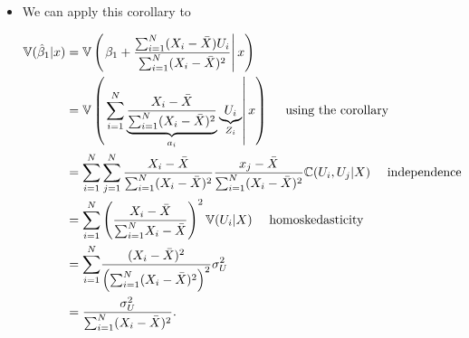 \begin{frame}[shrink]

\begin{itemize}

\item We can apply this corollary to 

\begin{align*}
  \mathbb{V}(\hat{\beta}_1|x) &=  \mathbb{V}\left(\left. \beta_1 + \frac{{\sum_{i=1}^N} (X_i - \bar{X})
        U_i}{{\sum_{i=1}^N} (X_i - \bar{X})^2} \right\vert x \right)  \\
  &=  \mathbb{V}\left(\left. {\sum_{i=1}^N} \underbrace{\frac{X_i - \bar{X}}{{\sum_{i=1}^N} (X_i -
          \bar{X})^2}}_{a_i} \underbrace{U_i}_{Z_i} \right\vert x
  \right)
  \ \ \  \text{ using the corollary } \\
  &=  {\sum_{i=1}^N} \sum_{j=1}^N \frac{X_i - \bar{X}}{{\sum_{i=1}^N} (X_i -
    \bar{X})^2} \frac{x_j - \bar{X}}{{\sum_{i=1}^N} (X_i -
    \bar{X})^2} \mathbb{C}(U_i, U_j | X)
  \ \ \  \text{ independence } \\
  &=  {\sum_{i=1}^N} \left(\frac{X_i - \bar{X}}{{\sum_{i=1}^N} X_i - \bar{X}}
  \right)^2 \mathbb{V}(U_i | X) 
  \ \ \  \text{ homoskedasticity} \\
 & =  {\sum_{i=1}^N} \frac{(X_i - \bar{X})^2}{\left( {\sum_{i=1}^N} (X_i - \bar{X})^2
    \right)^2} \sigma_U^2 \\
 & =  \frac{\sigma_U^2}{{\sum_{i=1}^N} (X_i - \bar{X})^2}.
\end{align*}
\end{itemize}
\end{frame}


